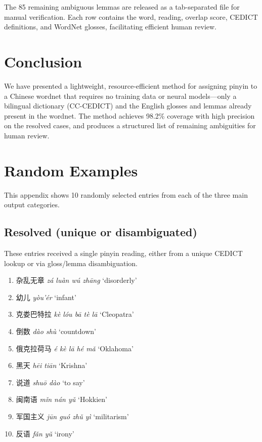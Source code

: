 \documentclass[11pt,a4paper]{article}
\begin{document}
The 85 remaining ambiguous lemmas are released as a tab-separated
file for manual verification.  Each row contains the word, reading,
overlap score, CEDICT definitions, and WordNet glosses, facilitating
efficient human review.

\section{Conclusion}

We have presented a lightweight, resource-efficient method for
assigning pinyin to a Chinese wordnet that requires no training data
or neural models---only a bilingual dictionary (CC-CEDICT) and the
English glosses and lemmas already present in the wordnet.  The method
achieves 98.2\% coverage with high precision on the resolved cases,
and produces a structured list of remaining ambiguities for human
review.

\appendix
\section{Random Examples}

This appendix shows 10 randomly selected entries from each of the
three main output categories.

\subsection{Resolved (unique or disambiguated)}

These entries received a single pinyin reading, either from a unique
CEDICT lookup or via gloss/lemma disambiguation.

\begin{enumerate}[nosep]
\item 杂乱无章 \emph{zá luàn wú zhāng} `disorderly'
\item 幼儿 \emph{yòu'ér} `infant'
\item 克娄巴特拉 \emph{kè lóu bā tè lā} `Cleopatra'
\item 倒数 \emph{dào shù} `countdown'
\item 俄克拉荷马 \emph{é kè lā hé mǎ} `Oklahoma'
\item 黑天 \emph{hēi tiān} `Krishna'
\item 说道 \emph{shuō dào} `to say'
\item 闽南语 \emph{mǐn nán yǔ} `Hokkien'
\item 军国主义 \emph{jūn guó zhǔ yì} `militarism'
\item 反语 \emph{fǎn yǔ} `irony'
\end{enumerate}
\end{document}
